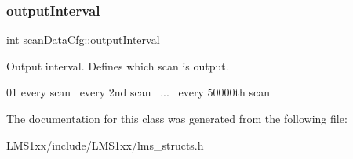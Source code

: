\subsubsection{\texorpdfstring{output\+Interval}{outputInterval}}
{\footnotesize\ttfamily int scan\+Data\+Cfg\+::output\+Interval}



Output interval. Defines which scan is output. 

01 every scan~ every 2nd scan~\newline
...~ every 50000th scan 

The documentation for this class was generated from the following file\+:\begin{DoxyCompactItemize}
\item 
L\+M\+S1xx/include/\+L\+M\+S1xx/lms\+\_\+structs.\+h\end{DoxyCompactItemize}
